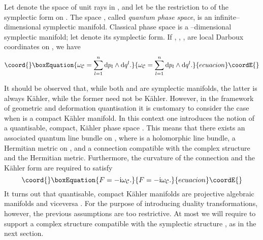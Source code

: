 \documentclass[a4paper,a4paper]{article}
\begin{document}
Let \coordHE{} denote the  space of unit rays in \coordHE{}, and let \coordHE{} 
be the restriction to \coordHE{} of the symplectic form \myHighlight{$\omega$}\coordHE{} on \coordHE{}. 
The space \coordHE{}, called {\it quantum phase space}, is an  infinite--dimensional
symplectic manifold. 
Classical phase space \coordHE{} is a \coordHE{}--dimensional symplectic 
manifold; let \coordHE{} denote its symplectic form. If \coordHE{}, \coordHE{}, \coordHE{}, 
are local Darboux coordinates on \coordHE{}, we have
\begin{equation}\coord{}\boxEquation{
\omega_{\cal C}=\sum_{l=1}^n{\rm d} p_l \wedge {\rm d} q^l.
\label{cano}
}{
\omega_{\cal C}=\sum_{l=1}^n{\rm d} p_l \wedge {\rm d} q^l.
}{ecuacion}\coordE{}\end{equation}

It should be observed that, while both \coordHE{} and \coordHE{} 
are symplectic manifolds, the latter is always K\"ahler, while the former 
need not be K\"ahler. However, in the framework of geometric \cite{GQUANT} 
and deformation \cite{BEREZIN, SCHLICHENMAIER, GARCIA} quantisation it is customary 
to consider the case when \coordHE{} is a compact K\"ahler manifold. 
In this context one introduces the notion of a quantisable, compact, K\"ahler 
phase space \coordHE{}. This means that there exists an associated quantum 
line bundle \coordHE{} on \coordHE{}, where \coordHE{} is a holomorphic line 
bundle, \coordHE{} a Hermitian metric on \coordHE{}, and \myHighlight{$\nabla$}\coordHE{} a connection 
compatible with the complex structure and the Hermitian metric.
Furthermore, the curvature \coordHE{} of the connection \myHighlight{$\nabla$}\coordHE{} and the K\"ahler form 
\coordHE{} are required to satisfy
\begin{equation}\coord{}\boxEquation{
F=-{\rm i} \omega_{\cal C}.
\label{quantti}
}{
F=-{\rm i} \omega_{\cal C}.
}{ecuacion}\coordE{}\end{equation}
It turns out that quantisable, compact K\"ahler manifolds are projective 
algebraic manifolds and viceversa \cite{SCHLICHENMAIER}. For the purpose 
of introducing duality transformations, however, the previous assumptions 
are too restrictive. At most we will require \coordHE{} to support a complex 
structure \coordHE{} compatible with the symplectic structure 
\coordHE{}, as in the next section.
\end{document}
